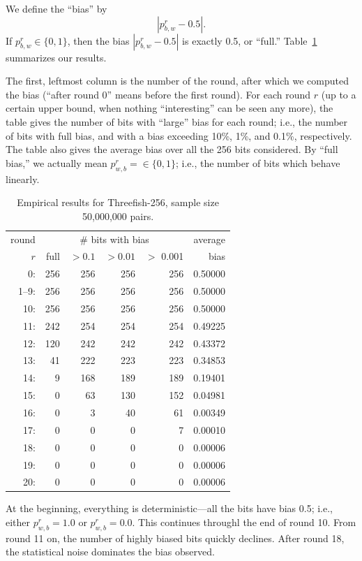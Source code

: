 \documentclass[11pt,twoside]{article}
\begin{document}
We define the ``bias'' by 
  \[ |p^r_{b,w}-0.5|. \]
If $p^r_{b,w} \in \{0,1\}$, then the bias $|p^r_{b,w}-0.5|$ is exactly 0.5, or ``full.''
Table~\ref{tab:ObservationsFor256} summarizes our results. 

The first, leftmost column is the number of the round, after which we computed the bias (``after round 0'' means before the first round).  For each round $r$ (up to a certain upper bound, when nothing ``interesting'' can be seen any more), the table gives the number of bits with ``large'' bias for each round; i.e., the number of bits with full bias, and with a bias exceeding 10\%, 1\%, and 0.1\%, respectively.  The table also gives the average bias over all the 256 bits considered. By ``full bias,'' we actually mean $p^r_{w,b}=\in \{0,1\}$; i.e., the number of bits which behave linearly. 

\begin{table}[tbh]
  \centering
\begin{tabular}{|r|rrrr|r|}
\hline
round & \multicolumn{ 4}{c|}{\# bits with bias} & average\\
$r$ & \quad full & $>0.1$ & $>0.01$ & $>$ 0.001 & bias \\  \hline
 0: &  256 &  256 &  256 &  256 & 0.50000  \\
 1--9: &  256 &  256 &  256 &  256 & 0.50000  \\
 10: &  256 &  256 &  256 &  256 & 0.50000  \\
 11: &  242 &  254 &  254 &  254 & 0.49225  \\
 12: &  120 &  242 &  242 &  242 & 0.43372  \\
 13: &  41 &  222 &  223 &  223 & 0.34853  \\
 14: &  9 &  168 &  189 &  189 & 0.19401  \\
 15: &  0 &  63 &  130 &  152 & 0.04981  \\
 16: &  0 &  3 &  40 &  61 & 0.00349  \\
 17: &  0 &  0 &  0 &  7 & 0.00010  \\
 18: &  0 &  0 &  0 &  0 & 0.00006  \\
 19: &  0 &  0 &  0 &  0 & 0.00006  \\
 20: &  0 &  0 &  0 &  0 & 0.00006  \\
\hline
\end{tabular}
  \caption{Empirical results for Threefish-256, sample size 50,000,000 pairs.}
  \label{tab:ObservationsFor256}
\end{table}

At the beginning, everything is deterministic---all the bits have bias 0.5; i.e., either $p^r_{w,b}=1.0$ or $p^r_{w,b}=0.0$. This continues throughl the end of round 10. From round 11 on, the number of highly biased bits quickly declines. After round 18, the statistical noise dominates the bias observed. 
\end{document}
